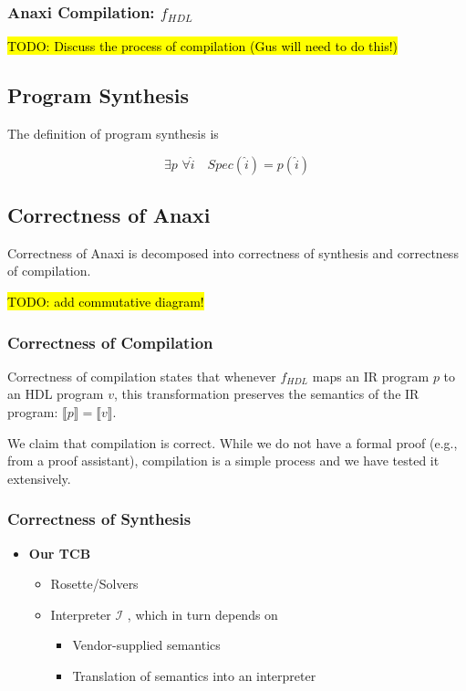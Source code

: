 \subsubsection{Anaxi Compilation: $f_{HDL}$}
\hl{TODO: Discuss the process of compilation (Gus will need to do this!)}

\subsection{Program Synthesis}

The definition of program synthesis is

$$\exists p\,\, \forall \hat{i} \quad Spec(\hat{i}) = p(\hat{i})$$


\subsection{Correctness of Anaxi}

Correctness of Anaxi is decomposed into correctness of synthesis and correctness of compilation.

\hl{TODO: add commutative diagram!}

\subsubsection{Correctness of Compilation}

Correctness of compilation states that whenever $f_{HDL}$ maps an IR program $p$ to an HDL program $v$, this transformation preserves the semantics of the IR program: $\llbracket p\rrbracket = \llbracket v \rrbracket$.

We claim that compilation is correct. While we do not have a formal proof (e.g., from a proof assistant), compilation is a simple process and we have tested it extensively.

\subsubsection{Correctness of Synthesis}

\begin{itemize}
\item \textbf{Our TCB}
  \begin{itemize}
	\item Rosette/Solvers
	\item Interpreter $\mathcal{I}$ , which in turn depends on
     \begin{itemize}
		\item Vendor-supplied semantics
		\item Translation of semantics into an interpreter
        \end{itemize}
    \end{itemize}
\end{itemize}

